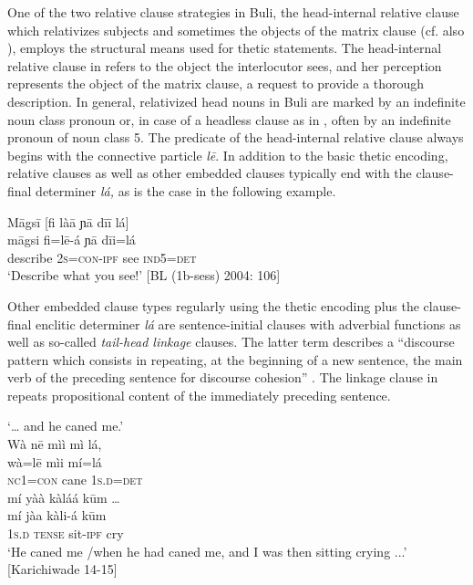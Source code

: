 \documentclass[output=paper]{langsci/langscibook}
\begin{document}
One of the two relative clause strategies in Buli, the head-internal relative clause which relativizes subjects and sometimes the objects of the matrix clause (cf. also \citealt{Hiraiwa2003}), employs the structural means used for thetic statements. The head-internal relative clause in  refers to the object the interlocutor sees, and her perception represents the object of the matrix clause, a request to provide a thorough description. In general, relativized head nouns in Buli are marked by an indefinite noun class pronoun or, in case of a headless clause as in , often by an indefinite pronoun of noun class 5. The predicate of the head-internal relative clause always begins with the connective particle \textit{l\={e}}. In addition to the basic thetic encoding, relative clauses as well as other embedded clauses typically end with the clause-final determiner \textit{lá, }as is the case in the following example.

\ea
\glll \textup{}  M\={a}gs\={i}    \textup{[}fi là\={a}     ɲ\={a}  d\={i}\={i}   lá\textup{]}\\
  \textup{  m\={a}gsi    fi=l\={e}-á     ɲ\={a}  d\={i}i=lá}\\
       describe    2\textsc{s}=\textsc{con}{}-\textsc{ipf}   see     \textsc{ind}5=\textsc{det}\\
\glt ‘Describe what you see!’ [BL (1b-sess) 2004: 106]
\z

Other embedded clause types regularly using the thetic encoding plus the clause-final enclitic determiner \textit{lá} are sentence-initial clauses with adverbial functions as well as so-called \textit{tail-head linkage} clauses. The latter term describes a “discourse pattern which consists in repeating, at the beginning of a new sentence, the main verb of the preceding sentence for discourse cohesion” \citep[109]{Guillaume2011}. The linkage clause in  repeats propositional content of the immediately preceding sentence. 

\ea
‘… and he caned me.’\\
\glll   Wà  n\={e}  mìì  mì   lá,\\
  \textup{  wà=l\={e}  mìi  mí=lá}\\
     \textsc{  nc}1=\textsc{con}\textsubscript{  }cane  1\textsc{s}.\textsc{d}=\textsc{det}\\
\glll   mí    yàà  kàláá    k\={u}m …\\
  \textup{  mí    jàa  kàli-á    k\={u}m}\\
       1\textsc{s}.\textsc{d}  \textsc{tense}  sit-\textsc{ipf}    cry\\
\glt ‘He caned me /when he had caned me, and I was then sitting crying ...’ [Karichiwade 14-15]
\z
\end{document}
